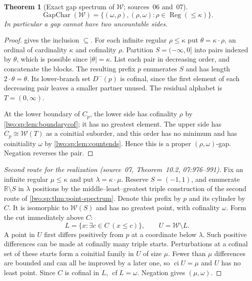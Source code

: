 \documentclass[11pt,a4paper]{article}
\newtheorem{theorem}{Theorem}[section]
\theoremstyle{definition}
\theoremstyle{remark}
\newcommand{\R}{\mathbb R}
\newcommand{\W}{\mathcal W}
\newcommand{\cf}{\operatorname{cf}}
\newcommand{\ci}{\operatorname{ci}}
\newcommand{\Reg}{\operatorname{Reg}}
\newcommand{\GapChar}{\operatorname{GapChar}}
\begin{document}
\begin{theorem}[Exact gap spectrum of $\W$; sources~06 and~07]\label{lwo:sp:thm:gapspectrum}
\[
 \GapChar(\W)=\{(\omega,\rho),(\rho,\omega):\rho\in\Reg(\le\kappa)\}.
\]
In particular a gap cannot have two uncountable sides.
\end{theorem}
\begin{proof}
 gives the inclusion $\subseteq$. For each
infinite regular $\rho\leq\kappa$ put $\theta=\kappa\cdot\rho$, an ordinal of
cardinality $\kappa$ and cofinality $\rho$. Partition $S=(-\infty,0]$ into
pairs indexed by $\theta$, which is possible since $|\theta|=\kappa$. List
each pair in decreasing order, and concatenate the blocks. The resulting
prefix $p$ enumerates $S$ and has length $2\cdot\theta=\theta$. Its
lower-branch set $D^-(p)$ is cofinal, since the first element of each
decreasing pair leaves a smaller partner unused. The residual alphabet is
$T=(0,\infty)$.

At the lower boundary of $C_p$, the lower side has cofinality $\rho$ by
\cref{lwo:sp:lem:boundarycof}; it has no greatest element. The upper side has
$C_p\cong\W(T)$ as a coinitial suborder, and this order has no minimum and
has coinitiality $\omega$ by \cref{lwo:sp:lem:countends}. Hence this is a
proper $(\rho,\omega)$-gap. Negation reverses the pair.
\end{proof}
\begin{proof}[Second route for the realization \textup{(source~07, Theorem~10.2, 07:976--991)}]
Fix an infinite regular $\mu\leq\kappa$ and put $\lambda=\kappa\cdot\mu$.
Reserve $S=(-1,1)$, and enumerate $\R\setminus S$ in $\lambda$ positions by the
middle--least--greatest triple construction of the second route of
\cref{lwo:sp:thm:point-spectrum}. Denote this prefix by $p$ and its cylinder by
$C$. It is isomorphic to $\W(S)$ and has no greatest point, with cofinality
$\omega$. Form the cut immediately above $C$:
\[
 L=\{x:\exists c\in C\ (x\leq c)\},\qquad U=\W\setminus L.
\]
A point in $U$ first differs positively from $p$ at a coordinate below
$\lambda$. Such positive differences can be made at cofinally many triple
starts. Perturbations at a cofinal set of these starts form a coinitial family
in $U$ of size $\mu$. Fewer than $\mu$ differences are bounded and can all be
improved by a later one, so $\ci U=\mu$ and $U$ has no least point. Since $C$ is
cofinal in $L$, $\cf L=\omega$. Negation gives $(\mu,\omega)$.
\end{proof}
\end{document}
